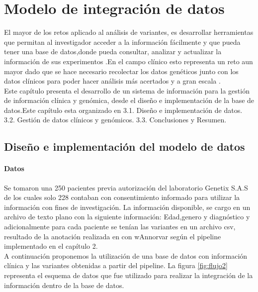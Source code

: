 \chapter{Modelo de integración de datos}

El mayor de los retos aplicado al análisis de variantes, es desarrollar herramientas que permitan al investigador acceder a la información fácilmente y que pueda tener una base de datos,donde pueda consultar, analizar y actualizar la información de sus experimentos \cite{Li2014}.En el campo clínico esto representa un reto aun mayor dado que se hace necesario recolectar los datos genéticos junto con los datos clínicos para poder hacer análisis más acertados y a gran escala \cite{Paila2013}.\\


Este capítulo presenta el desarrollo de un sistema de información para la gestión de información clínica y genómica, desde el diseño e implementación de la base de datos.Este capítulo esta   organizado en 3.1. Diseño e implementación de datos. 3.2. Gestión de datos clínicos y genómicos. 3.3. Conclusiones y  Resumen.

\section{Diseño e implementación del modelo de datos}

\subsubsection{Datos}

Se tomaron una  250 pacientes previa autorización  del laboratorio Genetix S.A.S de los cuales solo 228 contaban con consentimiento informado para utilizar la información con fines de investigación.  La información disponible, se cargo en un archivo de texto plano con la siguiente información: Edad,genero y diagnóstico y adicionalmente para cada paciente se tenían las variantes en un archivo csv, resultado de la anotación realizada en con wAnnorvar según el pipeline implementado en el capítulo 2.\\

A continuación proponemos la utilización de una base de datos con información clínica  y las variantes obtenidas a partir del pipeline. La figura \ref{fig:flujo2} representa el esquema de datos que fue utilizado para realizar la integración de la información dentro de la base de datos. \\ 

